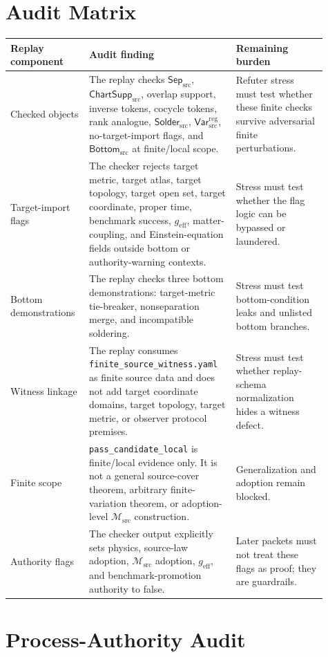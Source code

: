 \documentclass[11pt]{article}
\newcommand{\Msrc}{\mathcal{M}_{\mathrm{src}}}
\newcommand{\geff}{g_{\mathrm{eff}}}
\newcommand{\SepSrc}{\mathsf{Sep}_{\mathrm{src}}}
\newcommand{\ChartSuppSrc}{\mathsf{ChartSupp}_{\mathrm{src}}}
\newcommand{\SolderSrc}{\mathsf{Solder}_{\mathrm{src}}}
\newcommand{\VarRegSrc}{\mathsf{Var}^{\mathrm{reg}}_{\mathrm{src}}}
\newcommand{\BottomSrc}{\mathsf{Bottom}_{\mathrm{src}}}
\begin{document}
\section{Audit Matrix}

\begin{center}
\begin{tabular}{p{0.22\linewidth}p{0.42\linewidth}p{0.27\linewidth}}
\hline
Replay component & Audit finding & Remaining burden \\
\hline
Checked objects &
The replay checks \(\SepSrc\), \(\ChartSuppSrc\), overlap support, inverse
tokens, cocycle tokens, rank analogue, \(\SolderSrc\), \(\VarRegSrc\),
no-target-import flags, and \(\BottomSrc\) at finite/local scope. &
Refuter stress must test whether these finite checks survive adversarial
finite perturbations. \\
Target-import flags &
The checker rejects target metric, target atlas, target topology, target open
set, target coordinate, proper time, benchmark success, \(\geff\),
matter-coupling, and Einstein-equation fields outside bottom or
authority-warning contexts. &
Stress must test whether the flag logic can be bypassed or laundered. \\
Bottom demonstrations &
The replay checks three bottom demonstrations: target-metric tie-breaker,
nonseparation merge, and incompatible soldering. &
Stress must test bottom-condition leaks and unlisted bottom branches. \\
Witness linkage &
The replay consumes \texttt{finite\_source\_witness.yaml} as finite source data
and does not add target coordinate domains, target topology, target metric, or
observer protocol premises. &
Stress must test whether replay-schema normalization hides a witness defect. \\
Finite scope &
\texttt{pass\_candidate\_local} is finite/local evidence only. It is not a
general source-cover theorem, arbitrary finite-variation theorem, or
adoption-level \(\Msrc\) construction. &
Generalization and adoption remain blocked. \\
Authority flags &
The checker output explicitly sets physics, source-law adoption, \(\Msrc\)
adoption, \(\geff\), and benchmark-promotion authority to false. &
Later packets must not treat these flags as proof; they are guardrails. \\
\hline
\end{tabular}
\end{center}

\section{Process-Authority Audit}
\end{document}
